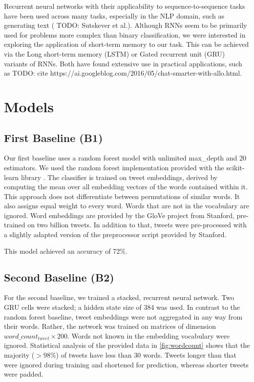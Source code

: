 \documentclass[10pt,conference,compsocconf]{IEEEtran}
\newcommand{\todo}[1]{}
\renewcommand{\todo}[1]{{\color{red} TODO: {#1}}}
\begin{document}
Recurrent neural networks with their applicability to
sequence-to-sequence tasks have been used across many tasks,
especially in the NLP domain, such as generating text (\todo{Sutskever
  et al.}). Although RNNs seem to be primarily used for problems more
complex than binary classification, we were interested in exploring
the application of short-term memory to our task. This can be achieved
via the Long short-term memory (LSTM) or Gated recurrent unit (GRU)
variants of RNNs. Both have found extensive use in practical
applications, such as \todo{cite
  https://ai.googleblog.com/2016/05/chat-smarter-with-allo.html}.

\section{Models}

\subsection{First Baseline (B1)}

Our first baseline uses a random forest model with unlimited
max\_depth and 20 estimators. We used the random forest implementation
provided with the scikit-learn library \cite{scikit-learn}.
The classifier is trained on tweet embeddings,
derived by computing the mean over all embedding
vectors of the words contained within it. This approach does not
differentiate between permutations of similar words. It also assigns
equal weight to every word. Words that are not in the vocabulary are
ignored. Word embeddings are provided by the GloVe \cite{glove}
project from Stanford, pre-trained on two billion tweets. In addition
to that, tweets were pre-processed with a slightly adapted version of
the preprocessor script provided by Stanford.

This model achieved an accuracy of 72\%.


\subsection{Second Baseline (B2)}

For the second baseline, we trained a stacked, recurrent neural
network. Two GRU cells were stacked; a hidden state size of 384 was used.
In contrast to the random forest baseline, tweet embeddings
were not aggregated in any way from their words. Rather, the network
was trained on matrices of dimension \(word\_count_{tweet} \times 200\).
Words not known in the embedding vocabulary were ignored.
Statistical analysis of the provided data in \autoref{fig:wordcount} shows that
the majority ($>$98\%) of tweets have less than 30 words.
Tweets longer than that were ignored during training and shortened for prediction,
whereas shorter tweets were padded.
\end{document}
